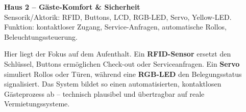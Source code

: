 
\vspace{0.5em}
\textbf{Haus 2 – Gäste-Komfort \& Sicherheit}\\
Sensorik/Aktorik: RFID, Buttons, LCD, RGB-LED, Servo, Yellow-LED.\\
Funktion: kontaktloser Zugang, Service-Anfragen, automatische Rollos, Beleuchtungssteuerung.

Hier liegt der Fokus auf dem Aufenthalt. Ein \textbf{RFID-Sensor} ersetzt den Schlüssel, Buttons ermöglichen Check-out oder Serviceanfragen.
Ein \textbf{Servo} simuliert Rollos oder Türen, während eine \textbf{RGB-LED} den Belegungsstatus signalisiert.
Das System bildet so einen automatisierten, kontaktlosen Gästeprozess ab – technisch plausibel und übertragbar auf reale Vermietungssysteme.

